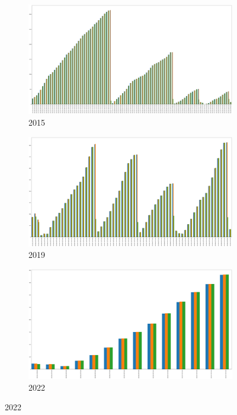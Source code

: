 \begin{figure}[h]
	\centering
	\caption{Before, after and daily DMC maximum value}
	\begin{subfigure}{0.45\textwidth}
		\centering
		\includegraphics[width=\textwidth]{graphs/2015/byHour/DMC_max_before_after.png}
		\caption{2015}
	\end{subfigure}
	\hfill
	\begin{subfigure}{0.45\textwidth}
		\centering
		\includegraphics[width=\textwidth]{graphs/2019/byHour/DMC_max_before_after.png}
		\caption{2019}
	\end{subfigure}
	\hfill
	\begin{subfigure}{0.45\textwidth}
		\centering
		\includegraphics[width=\textwidth]{graphs/2022/DMC_max_before_after.png}
		\caption{2022}
	\end{subfigure}
	\label{fig:daily_dmc_after_before_max}
\end{figure}

